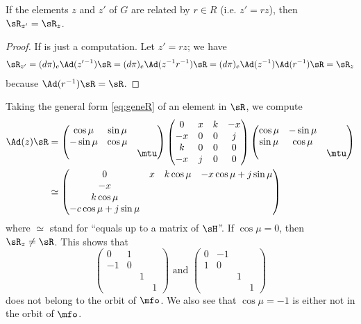 \begin{proposition}
If the elements $z$ and $z'$ of $G$ are related by $r\in R$ (i.e. $z'=rz$), then $\sR_{z'}=\sR_z$.
\end{proposition}

\begin{proof}
If is just a computation. Let $z'=rz$; we have
\begin{equation}
\begin{split}
\sR_{z'}=(d\pi)_e\Ad(z'\,\!^{-1})\sR
        =(d\pi)_e\Ad(z^{-1} r^{-1})\sR
	=(d\pi)_e\Ad(z^{-1})\Ad(r^{-1})\sR
	=\sR_z
\end{split}
\end{equation}
because $\Ad(r^{-1})\sR=\sR$.
\end{proof}

Taking the general form \eqref{eq:geneR} of an element in $\sR$, we compute
\begin{equation}
\begin{split}
\Ad(z)\sR&=
\begin{pmatrix}
\cos\mu & \sin\mu\\
-\sin\mu & \cos\mu\\
&&\mtu
\end{pmatrix}
\begin{pmatrix}
0&x&k&-x\\
-x&0&0&j\\
k&0&0&0\\
-x&j&0&0
\end{pmatrix}
\begin{pmatrix}
\cos\mu & -\sin\mu\\
\sin\mu & \cos\mu\\
&&\mtu
\end{pmatrix}
\\
&\simeq
\begin{pmatrix}
0& x&k\cos\mu &-x\cos\mu+j\sin\mu\\
-x\\
k\cos\mu\\
-c\cos\mu+j\sin\mu
\end{pmatrix}
\end{split}
\end{equation}
where $\simeq$ stand for ``equals up to a matrix of $\sH$''. If $\cos\mu=0$, then $\sR_z\neq\sR$. This shows that 
\begin{equation}
\begin{pmatrix}
0&1\\
-1&0\\
&&1\\
&&&1
\end{pmatrix}
\text{ and }
\begin{pmatrix}
0&-1\\
1&0\\
&&1\\
&&&1
\end{pmatrix}
\end{equation}
does not belong to the orbit of $\mfo$. We also see that $\cos \mu=-1$ is either not in the orbit of $\mfo$.

